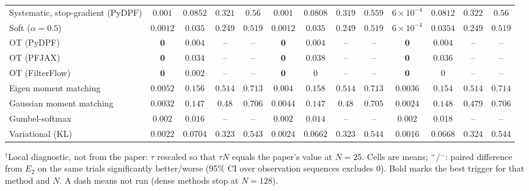 \begin{table}[ht]
\begin{adjustbox}{max width=\linewidth}
\begin{tabular}{lcccc|cccc|cccc}
Systematic, stop-gradient (PyDPF) & $\mathbf{0.001}$ & $\mathbf{0.0852}$ & $0.321$ & $\mathbf{0.56}$ & $\mathbf{0.001}$ & $0.0808$ & $0.319$ & $0.559$ & $6\times10^{-4}$ & $0.0812$ & $\mathbf{0.322}$ & $0.56$ \\
Soft ($\alpha{=}0.5$) & $\mathbf{0.0012}$ & $0.035$ & $\mathbf{0.249}$ & $\mathbf{0.519}$ & $\mathbf{0.0012}$ & $0.035$ & $\mathbf{0.249}$ & $\mathbf{0.519}$ & $6\times10^{-4}$ & $\mathbf{0.0354}$ & $\mathbf{0.249}$ & $\mathbf{0.519}$ \\
OT (PyDPF) & $\mathbf{0}$ & $\mathbf{0.004}$ & -- & -- & $\mathbf{0}$ & $\mathbf{0.004}$ & -- & -- & $\mathbf{0}$ & $\mathbf{0.004}$ & -- & -- \\
OT (PFJAX) & $\mathbf{0}$ & $0.034$ & -- & -- & $\mathbf{0}$ & $\mathbf{0.038}$ & -- & -- & $\mathbf{0}$ & $0.036$ & -- & -- \\
OT (FilterFlow) & $\mathbf{0}$ & $\mathbf{0.002}$ & -- & -- & $\mathbf{0}$ & $0$ & -- & -- & $\mathbf{0}$ & $0$ & -- & -- \\
Eigen moment matching & $\mathbf{0.0052}$ & $0.156$ & $0.514$ & $0.713$ & $0.004$ & $\mathbf{0.158}$ & $0.514$ & $0.713$ & $0.0036$ & $0.154$ & $\mathbf{0.514}$ & $\mathbf{0.714}$ \\
Gaussian moment matching & $0.0032$ & $0.147$ & $\mathbf{0.48}$ & $\mathbf{0.706}$ & $\mathbf{0.0044}$ & $0.147$ & $\mathbf{0.48}$ & $0.705$ & $0.0024$ & $\mathbf{0.148}$ & $0.479$ & $\mathbf{0.706}$ \\
Gumbel-softmax & $\mathbf{0.002}$ & $0.016$ & -- & -- & $\mathbf{0.002}$ & $0.014$ & -- & -- & $\mathbf{0.002}$ & $\mathbf{0.018}$ & -- & -- \\
Variational (KL) & $0.0022$ & $\mathbf{0.0704}$ & $0.323$ & $0.543$ & $\mathbf{0.0024}$ & $0.0662$ & $0.323$ & $\mathbf{0.544}$ & $0.0016$ & $0.0668$ & $\mathbf{0.324}$ & $0.544$ \\
\bottomrule
\end{tabular}
\end{adjustbox}
\par\smallskip\parbox{0.95\linewidth}{\footnotesize $^\dagger$Local diagnostic, not from the paper: $\tau$ rescaled so that $\tau N$ equals the paper's value at $N{=}25$. Cells are means; $^{+}$/$^{-}$: paired difference from $E_2$ on the same trials significantly better/worse (95\% CI over observation sequences excludes 0). Bold marks the best trigger for that method and $N$. A dash means not run (dense methods stop at $N{=}128$).}
\end{table}

